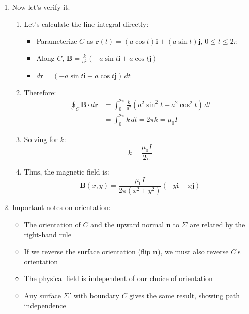 \begin{example}
\begin{solution}
\begin{enumerate}
\item Now let's verify it.
\begin{enumerate}
\item Let's calculate the line integral directly:
   \begin{itemize}
       \item Parameterize $C$ as $\mathbf{r}(t) = (a\cos t)\mathbf{i} + (a\sin t)\mathbf{j}$, $0 \leq t \leq 2\pi$
       \item Along $C$, $\mathbf{B} = \frac{k}{a^2}(-a\sin t\mathbf{i} + a\cos t\mathbf{j})$
       \item $d\mathbf{r} = (-a\sin t\mathbf{i} + a\cos t\mathbf{j})\,dt$
   \end{itemize}
   
\item Therefore:
   \begin{align*}
   \oint_C \mathbf{B} \cdot d\mathbf{r} &= \int_0^{2\pi} \frac{k}{a^2}(a^2\sin^2t + a^2\cos^2t)\,dt \\
   &= \int_0^{2\pi} k\,dt = 2\pi k = \mu_0 I
   \end{align*}

\item Solving for $k$:
   \[
   k = \frac{\mu_0 I}{2\pi}
   \]

\item Thus, the magnetic field is:
   \[
   \mathbf{B}(x,y) = \frac{\mu_0 I}{2\pi(x^2 + y^2)}\left(-y\mathbf{i} + x\mathbf{j}\right)
   \]
\end{enumerate}

\item Important notes on orientation:
   \begin{itemize}
       \item The orientation of $C$ and the upward normal $\mathbf{n}$ to $\Sigma$ are related by the right-hand rule
       \item If we reverse the surface orientation (flip $\mathbf{n}$), we must also reverse $C$'s orientation
       \item The physical field is independent of our choice of orientation
       \item Any surface $\Sigma'$ with boundary $C$ gives the same result, showing path independence
   \end{itemize}
\end{enumerate}
\end{solution}
\end{example}
\exampleline

